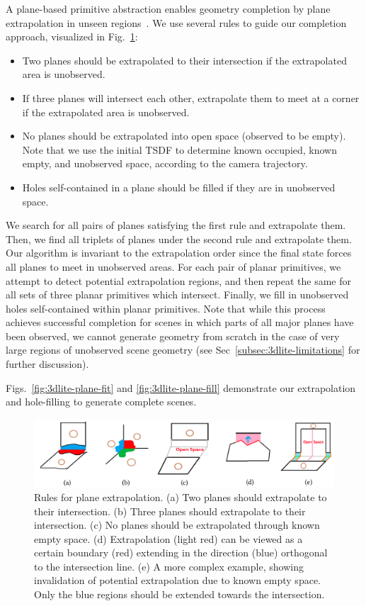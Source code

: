 A plane-based primitive abstraction enables geometry completion by plane extrapolation in unseen regions~\cite{dzitsiuk2016noising}.
We use several rules to guide our completion approach, visualized in Fig.~\ref{fig:3dlite-extrap-illus}:
\begin{itemize}
    \item Two planes should be extrapolated to their intersection if the extrapolated area is unobserved.
    \item If three planes will intersect each other, extrapolate them to meet at a corner if the extrapolated area is unobserved.
    \item No planes should be extrapolated into open space (observed to be empty). Note that we use the initial TSDF to determine known occupied, known empty, and unobserved space, according to the camera trajectory.
    \item Holes self-contained in a plane should be filled if they are in unobserved space.
\end{itemize}

We search for all pairs of planes satisfying the first rule and extrapolate them. 
Then, we find all triplets of planes under the second rule and extrapolate them. 
Our algorithm is invariant to the extrapolation order since the final state forces all planes to meet in unobserved areas.
For each pair of planar primitives, we attempt to detect potential extrapolation regions, and then repeat the same for all sets of three planar primitives which intersect. Finally, we fill in unobserved holes self-contained within planar primitives.
Note that while this process achieves successful completion for scenes in which parts of all major planes have been observed, we cannot generate geometry from scratch in the case of very large regions of unobserved scene geometry (see Sec~\ref{subsec:3dlite-limitations} for further discussion).

Figs.~\ref{fig:3dlite-plane-fit} and \ref{fig:3dlite-plane-fill} demonstrate our extrapolation and hole-filling to generate complete scenes.

\begin{figure}
    \centering
    \includegraphics[width=0.8\linewidth]{3dlite/fig8.png}
    \caption{Rules for plane extrapolation. (a) Two planes should extrapolate to their intersection. (b) Three planes should extrapolate to their intersection. (c) No planes should be extrapolated through known empty space. (d) Extrapolation (light red) can be viewed as a certain boundary (red) extending in the direction (blue) orthogonal to the intersection line. (e) A more complex example, showing invalidation of potential extrapolation due to known empty space. Only the blue regions should be extended towards the intersection.}
    \label{fig:3dlite-extrap-illus}
\end{figure}

